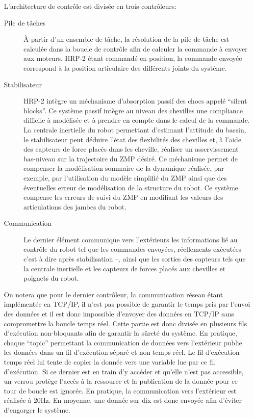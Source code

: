 L'architecture de contrôle est divisée en trois contrôleurs:
\begin{description}
\item[Pile de tâches] À partir d'un ensemble de tâche, la résolution
  de la pile de tâche est calculée dans la boucle de contrôle afin de
  calculer la commande à envoyer aux moteurs. HRP-2 étant commandé en
  position, la commande envoyée correspond à la position articulaire
  des différents joints du système.
\item[Stabilisateur] HRP-2 intègre un méchanisme d'absorption passif
  des chocs appelé ``silent blocks''. Ce système passif intègre au
  niveau des chevilles une compliance difficile à modélisée et à
  prendre en compte dans le calcul de la commande. La centrale
  inertielle du robot permettant d'estimant l'attitude du bassin, le
  stabilisateur peut déduire l'état des flexbilités des chevilles et,
  à l'aide des capteurs de force placés dans les cheville, réaliser un
  asservissement bas-niveau sur la trajectoire du ZMP désiré. Ce
  méchanisme permet de compenser la modélisation sommaire de la
  dynamique réalisée, par exemple, par l'utilisation du modèle
  simplifié du ZMP ainsi que des éventuelles erreur de modélisation de
  la structure du robot. Ce système compense les erreurs de suivi du
  ZMP en modifiant les valeurs des articulations des jambes du robot.
\item[Communication] Le dernier élément communique vers l'extérieurs
  les informations lié au contrôle du robot tel que les commandes
  envoyées, réellements exécutées -- c'est à dire après stabilisation
  --, ainsi que les sorties des capteurs tels que la centrale
  inertielle et les capteurs de forces placés aux chevilles et
  poignets du robot.
\end{description}


On notera que pour le dernier contrôleur, la communication réseau
étant implémentée en TCP/IP, il n'est pas possible de garantir le
temps pris par l'envoi des données et il est donc impossible d'envoyer
des données en TCP/IP sans compromettre la boucle temps réel. Cette
partie est donc divisée en plusieurs fils d'exécution non-bloquants
afin de garantir la sûreté du système. En pratique, chaque ``topic''
permettant la communication de données vers l'extérieur publie les
données dans un fil d'exécution séparé et non temps-réel. Le fil
d'exécution temps réel lui tente de copier la donnée vers une variable
lue par ce fil d'exécution. Si ce dernier est en train d'y accéder et
qu'elle n'est pas accessible, un verrou protège l'accès à la ressource
et la publication de la donnée pour ce tour de boucle est ignorée. En
pratique, la communication vers l'extérieur est réalisée à 20Hz. En
moyenne, une donnée sur dix est donc envoyée afin d'éviter d'engorger
le système.


